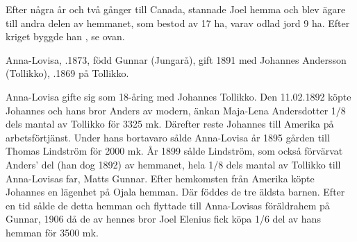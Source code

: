 %
Efter några år och två gånger till Canada, stannade Joel hemma och blev ägare till andra delen av hemmanet, som bestod av 17 ha, varav odlad jord 9 ha. Efter kriget byggde han , se ovan.



%


%
Anna-Lovisa, .1873, född Gunnar (Jungarå), gift 1891 med Johannes Andersson (Tollikko), .1869 på Tollikko.
\begin{jhchildren}
  \item {}
  \item {}
  \item {}
  \item {}
  \item {}
  \item {}
  \item {}
  \item {}
  \item {}
  \item {}
\end{jhchildren}
Anna-Lovisa gifte sig som 18-åring med Johannes Tollikko. Den 11.02.1892 köpte Johannes och hans bror Anders av modern, änkan Maja-Lena Andersdotter 1/8 dels mantal av Tollikko för 3325 mk. Därefter reste Johannes till Amerika på arbetsförtjänst. Under hans bortavaro sålde Anna-Lovisa år 1895 gården till Thomas Lindström för 2000 mk. År 1899 sålde Lindström, som också förvärvat Anders' del (han dog 1892) av hemmanet, hela 1/8 dels mantal av Tollikko till Anna-Lovisas far, Matts Gunnar.
Efter hemkomsten från Amerika köpte Johannes en lägenhet på Ojala hemman. Där föddes de tre äldsta barnen. Efter en tid sålde de detta hemman och flyttade till Anna-Lovisas föräldrahem på Gunnar, 1906 då de av hennes bror Joel Elenius fick köpa 1/6 del av hans hemman för 3500 mk.

